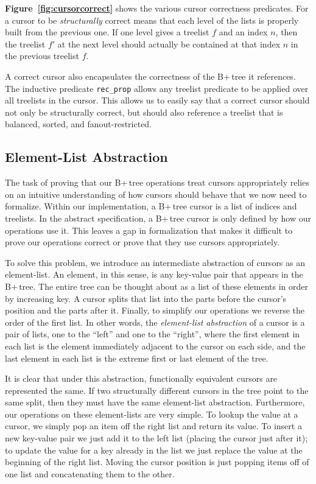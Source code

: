 \documentclass[12pt]{article}
\begin{document}
\textbf{Figure~\ref{fig:cursorcorrect}} shows the various cursor correctness predicates. For a cursor to be \textit{structurally} correct means that each level of the lists is properly built from the previous one. If one level gives a treelist $f$ and an index $n$, then the treelist $f'$ at the next level should actually be contained at that index $n$ in the previous treelist $f$.

A correct cursor also encapsulates the correctness of the B+\,tree it references. The inductive predicate \texttt{rec\_prop} allows any treelist predicate to be applied over all treelists in the cursor. This allows us to easily say that a correct cursor should not only be structurally correct, but should also reference a treelist that is balanced, sorted, and fanout-restricted.

\subsection{Element-List Abstraction}

The task of proving that our B+\,tree operations treat cursors appropriately relies on an intuitive understanding of how cursors should behave that we now need to formalize. Within our implementation, a B+\,tree cursor is a list of indices and treelists. In the abstract specification, a B+\,tree cursor is only defined by how our operations use it. This leaves a gap in formalization that makes it difficult to prove our operations correct or prove that they use cursors appropriately.

To solve this problem, we introduce an intermediate abstraction of cursors as an element-list. An element, in this sense, is any key-value pair that appears in the B+\,tree. The entire tree can be thought about as a list of these elements in order by increasing key. A cursor splits that list into the parts before the cursor’s position and the parts after it.  Finally, to simplify our operations we reverse the order of the first list. In other words, the \textit{element-list abstraction} of a cursor is a pair of lists, one to the “left” and one to the “right”, where the first element in each list is the element immediately adjacent to the cursor on each side, and the last element in each list is the extreme first or last element of the tree.

It is clear that under this abstraction, functionally equivalent cursors are represented the same. If two structurally different cursors in the tree point to the same split, then they must have the same element-list abstraction. Furthermore, our operations on these element-lists are very simple. To lookup the value at a cursor, we simply pop an item off the right list and return its value. To insert a new key-value pair we just add it to the left list (placing the cursor just after it); to update the value for a key already in the list we just replace the value at the beginning of the right list. Moving the cursor position is just popping items off of one list and concatenating them to the other.
\end{document}
